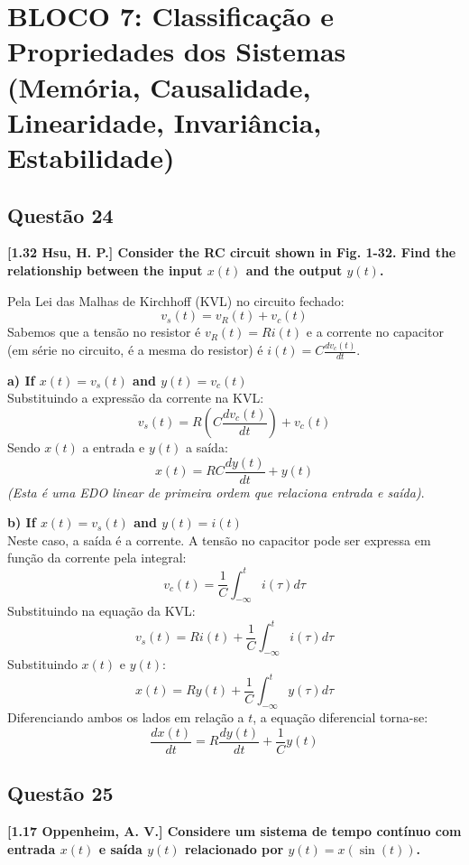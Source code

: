 \section{BLOCO 7: Classificação e Propriedades dos Sistemas (Memória, Causalidade, Linearidade, Invariância, Estabilidade)}\label{bloco-7-classificauxe7uxe3o-e-propriedades-dos-sistemas-memuxf3ria-causalidade-linearidade-invariuxe2ncia-estabilidade}

\subsection{Questão 24}\label{questuxe3o-24}

\textbf{{[}1.32 Hsu, H. P.{]} Consider the RC circuit shown in Fig. 1-32. Find the relationship between the input \(x(t)\) and the output \(y(t)\).}

Pela Lei das Malhas de Kirchhoff (KVL) no circuito fechado:
\[v_s(t) = v_R(t) + v_c(t)\]
Sabemos que a tensão no resistor é \(v_R(t) = R i(t)\) e a corrente no capacitor (em série no circuito, é a mesma do resistor) é \(i(t) = C \frac{dv_c(t)}{dt}\).

\textbf{a) If \(x(t) = v_s(t)\) and \(y(t) = v_c(t)\)}\\
Substituindo a expressão da corrente na KVL:
\[v_s(t) = R \left( C \frac{dv_c(t)}{dt} \right) + v_c(t)\]
Sendo \(x(t)\) a entrada e \(y(t)\) a saída:
\[x(t) = RC \frac{dy(t)}{dt} + y(t)\]
\emph{(Esta é uma EDO linear de primeira ordem que relaciona entrada e saída)}.

\textbf{b) If \(x(t) = v_s(t)\) and \(y(t) = i(t)\)}\\
Neste caso, a saída é a corrente. A tensão no capacitor pode ser expressa em função da corrente pela integral:
\[v_c(t) = \frac{1}{C} \int_{-\infty}^{t} i(\tau) d\tau\]
Substituindo na equação da KVL:
\[v_s(t) = R i(t) + \frac{1}{C} \int_{-\infty}^{t} i(\tau) d\tau\]
Substituindo \(x(t)\) e \(y(t)\):
\[x(t) = R y(t) + \frac{1}{C} \int_{-\infty}^{t} y(\tau) d\tau\]
Diferenciando ambos os lados em relação a \(t\), a equação diferencial torna-se:
\[\frac{dx(t)}{dt} = R \frac{dy(t)}{dt} + \frac{1}{C} y(t)\]

\subsection{Questão 25}\label{questuxe3o-25}

\textbf{{[}1.17 Oppenheim, A. V.{]} Considere um sistema de tempo contínuo com entrada \(x(t)\) e saída \(y(t)\) relacionado por \(y(t) = x(\sin(t))\).}

